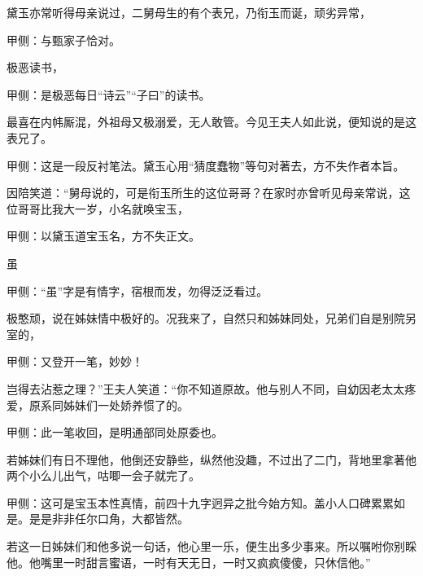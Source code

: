 \begin{parag}
    黛玉亦常听得母亲说过，二舅母生的有个表兄，乃衔玉而诞，顽劣异常，\begin{note}甲侧：与甄家子恰对。\end{note}极恶读书，\begin{note}甲侧：是极恶每日“诗云”“子曰”的读书。\end{note}最喜在内帏厮混，外祖母又极溺爱，无人敢管。今见王夫人如此说，便知说的是这表兄了。\begin{note}甲侧：这是一段反衬笔法。黛玉心用“猜度蠢物”等句对著去，方不失作者本旨。\end{note}因陪笑道：“舅母说的，可是衔玉所生的这位哥哥？在家时亦曾听见母亲常说，这位哥哥比我大一岁，小名就唤宝玉，\begin{note}甲侧：以黛玉道宝玉名，方不失正文。\end{note}虽\begin{note}甲侧：“虽”字是有情字，宿根而发，勿得泛泛看过。\end{note}极憨顽，说在姊妹情中极好的。况我来了，自然只和姊妹同处，兄弟们自是别院另室的，\begin{note}甲侧：又登开一笔，妙妙！\end{note}岂得去沾惹之理？”王夫人笑道：“你不知道原故。他与别人不同，自幼因老太太疼爱，原系同姊妹们一处娇养惯了的。\begin{note}甲侧：此一笔收回，是明通部同处原委也。\end{note}若姊妹们有日不理他，他倒还安静些，纵然他没趣，不过出了二门，背地里拿著他两个小么儿出气，咕唧一会子就完了。\begin{note}甲侧：这可是宝玉本性真情，前四十九字迥异之批今始方知。盖小人口碑累累如是。是是非非任尔口角，大都皆然。\end{note}若这一日姊妹们和他多说一句话，他心里一乐，便生出多少事来。所以嘱咐你别睬他。他嘴里一时甜言蜜语，一时有天无日，一时又疯疯傻傻，只休信他。”
\end{parag}


